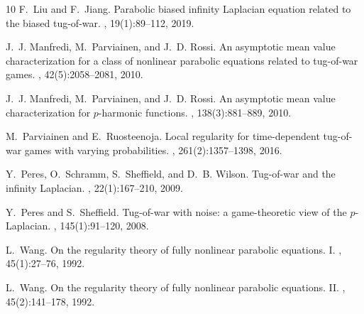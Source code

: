 \documentclass[a4paper,11pt]{amsart}
\theoremstyle{plain}
\theoremstyle{definition}
\numberwithin{equation}{section}
\begin{document}
\begin{thebibliography}{10}
	F.~Liu and F.~Jiang.
	\newblock Parabolic biased infinity {Laplacian} equation related to the biased
	tug-of-war.
	, 19(1):89--112, 2019.
	
	J.~J. Manfredi, M.~Parviainen, and J.~D. Rossi.
	\newblock An asymptotic mean value characterization for a class of nonlinear
	parabolic equations related to tug-of-war games.
	, 42(5):2058--2081, 2010.
	
	J.~J. Manfredi, M.~Parviainen, and J.~D. Rossi.
	\newblock An asymptotic mean value characterization for {$p$}-harmonic
	functions.
	, 138(3):881--889, 2010.
	
	M.~Parviainen and E.~Ruosteenoja.
	\newblock Local regularity for time-dependent tug-of-war games with varying
	probabilities.
	, 261(2):1357--1398, 2016.
	
	Y.~Peres, O.~Schramm, S.~Sheffield, and D.~B. Wilson.
	\newblock Tug-of-war and the infinity {L}aplacian.
	, 22(1):167--210, 2009.
	
	Y.~Peres and S.~Sheffield.
	\newblock Tug-of-war with noise: a game-theoretic view of the
	{$p$}-{L}aplacian.
	, 145(1):91--120, 2008.
	
	L.~Wang.
	\newblock On the regularity theory of fully nonlinear parabolic equations. {I}.
	, 45(1):27--76, 1992.
	
	L.~Wang.
	\newblock On the regularity theory of fully nonlinear parabolic equations.
	{II}.
	, 45(2):141--178, 1992.
\end{thebibliography}
\end{document}

